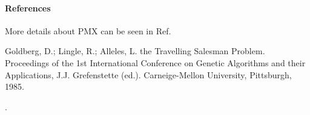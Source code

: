 \documentclass[letterpaper,10pt,english]{sphinxmanual}
\begin{document}
\begin{fulllineitems}
\begin{quote}
\begin{description}
\begin{description}
\end{description}

\end{description}\end{quote}
\paragraph{References}

More details about PMX can be seen in Ref. %
\begin{footnote}[4]\sphinxAtStartFootnote
Goldberg, D.; Lingle, R.; Alleles, L. the Travelling Salesman Problem.
Proceedings of the 1st International Conference on Genetic Algorithms and
their Applications, J.J. Grefenstette (ed.). Carneige-Mellon University,
Pittsburgh, 1985.
%
\end{footnote}.

\end{fulllineitems}

\end{document}
